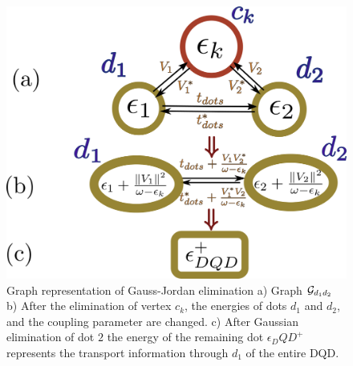 \begin{figure}[t]
    \centering
    \includegraphics[scale=0.3]{IMAGES/Graphs/DQD-Pro.png}
    \caption{  \label{fig:graphDQD} Graph representation of Gauss-Jordan elimination a) Graph $\mathcal{G}_{d_1d_2}$ b) After the elimination of vertex $c_k$, the energies of dots $d_1$ and $d_2$, and the coupling parameter are changed. c) After Gaussian elimination of dot $2$ the energy of the remaining dot $\epsilon_DQD^+$ represents the transport information through $d_1$ of the entire DQD. \protect\Source{}}
    
\end{figure}


